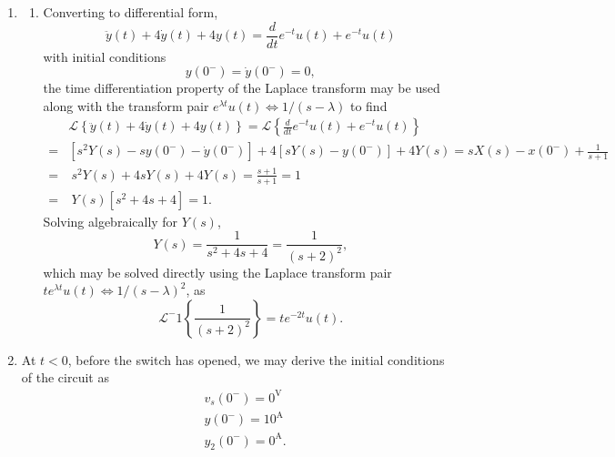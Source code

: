 \documentclass{article}
\begin{document}
\begin{enumerate}[label=\thesubsubsection]
\begin{enumerate}[label=\alph*)]
\begin{align*}
					=& \frac{1}{s} - \frac{e^{-s}}{s} = \frac{1-e^{-s}}{s}.\\
				\end{align*}
			\item Likewise, using the time-shifting property of the Laplace transform along with the Laplace transform pair \(e^{\lambda t}u(t) \Leftrightarrow 1/(s-\lambda)\),
				\[
					\mathcal{L}\left\{e^{-(t-\tau)}u(t-\tau)\right\} = \frac{e^{-s\tau}}{s+t}.
				\]
		\end{enumerate}
		\setcounter{subsection}{3}
		\setcounter{subsubsection}{1}
		\item
			\begin{enumerate}[label=\alph*)]
			  \addtocounter{enumii}{1}	
				\item Converting to differential form, 
					\[
						\ddot{y}(t) + 4\dot{y}(t) + 4y(t) = \frac{d}{dt}e^{-t}u(t) + e^{-t}u(t)
					\]
					with initial conditions
					\[
						y(0^-) = \dot{y}(0^-) = 0,
					\]
					the time differentiation property of the Laplace transform may be used along with the transform pair \(e^{\lambda t}u(t) \Leftrightarrow 1/(s-\lambda)\) to find
					\begin{align*}
					&\mathcal{L}\left\{\ddot{y}(t) + 4\dot{y}(t) + 4y(t)\right\} = \mathcal{L}\left\{\frac{d}{dt}e^{-t}u(t) + e^{-t}u(t)\right\} \\
						=&\left[s^2Y(s) - sy(0^-) - \dot{y}(0^-)\right] + 4\left[sY(s) - y(0^-)\right] + 4Y(s) = sX(s) - x(0^-) + \frac{1}{s+1}\\
						=& \ s^2Y(s) + 4sY(s) + 4Y(s) = \frac{s+1}{s+1} = 1\\
						=& \ Y(s)\left[s^2+4s+4\right] = 1.
					\end{align*}
					Solving algebraically for \(Y(s)\),
					\[
					  Y(s) = \frac{1}{s^2 + 4s + 4} = \frac{1}{(s+2)^2},
					\]
					which may be solved directly using the Laplace transform pair \(te^{\lambda t}u(t) \Leftrightarrow 1/(s-\lambda)^2\), as
					\[
						\mathcal{L}^-1\left\{\frac{1}{(s+2)^2}\right\} = te^{-2t}u(t).
					\]
			\end{enumerate}
			\setcounter{subsection}{4}
			\setcounter{subsubsection}{7}
		\item At \(t<0\), before the switch has opened, we may derive the initial conditions of the circuit as 
			\begin{align*}
				&v_s(0^-) = 0^{\mathrm{V}} \\
				&y(0^-) = 10^{\mathrm{A}} \\
				&y_2(0^-) = 0^{\mathrm{A}}.
			\end{align*}

\end{enumerate}
\end{document}
